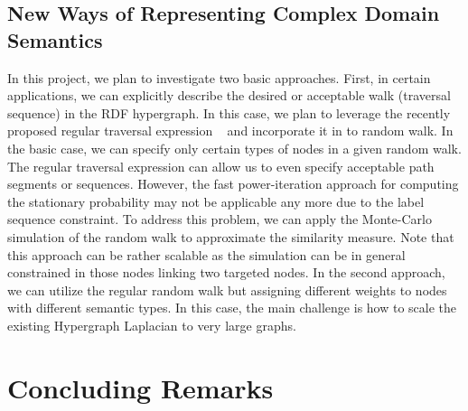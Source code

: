 \subsection{New Ways of Representing Complex Domain Semantics}
In this project, we plan to investigate two basic approaches.
First, in certain applications, we can explicitly describe the desired or acceptable walk (traversal sequence) in the RDF hypergraph. In this case, we plan to leverage the recently proposed regular traversal expression ~\cite{Marko10} and incorporate it in to random walk. In the basic case, we can specify only certain types of nodes in a given random walk. The regular traversal expression can allow us to even specify acceptable path segments or sequences.
However, the fast power-iteration approach for computing the stationary probability may not be applicable any more due to the label sequence constraint.
To address this problem, we can apply the Monte-Carlo simulation of the random walk to approximate the similarity measure. Note that this approach can be rather scalable as the simulation can be in general constrained in those nodes linking two targeted nodes.
In the second approach, we can utilize the regular random walk but assigning different  weights to nodes with different semantic types. In this case, the main challenge is how to scale the existing  Hypergraph Laplacian to very large graphs.

\section{Concluding Remarks}